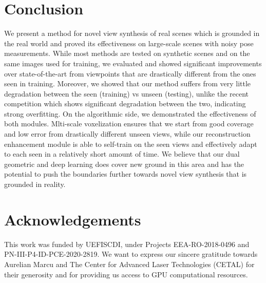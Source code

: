 \documentclass{article}
\begin{document}
\section{Conclusion}

We present a method for novel view synthesis of real scenes which is grounded in the real world and proved its effectiveness on large-scale scenes with noisy pose measurements. While most methods are tested on synthetic scenes and on the same images used for training, we evaluated and showed significant improvements over state-of-the-art from viewpoints that are drastically different from the ones seen in training. Moreover, we showed that our method suffers from very little degradation between the seen (training) vs unseen (testing), unlike the recent competition which shows significant degradation between the two, indicating strong overfitting. On the algorithmic side, we demonstrated the effectiveness of both modules. Mlti-scale voxelization ensures that we start from good coverage and low error from drastically different unseen views, while our reconstruction enhancement module is able to self-train on the seen views and effectively adapt to each seen in a relatively short amount of time. We believe that our dual geometric and deep learning does cover new ground in this area and has the potential to push the boundaries further towards novel view synthesis that is grounded in reality.

\section{Acknowledgements}

This work was funded by UEFISCDI, under Projects EEA-RO-2018-0496 and PN-III-P4-ID-PCE-2020-2819. We want to express our sincere gratitude towards Aurelian Marcu and The Center for Advanced Laser Technologies (CETAL) for their generosity and for providing us access to GPU computational resources.

{


}
\end{document}

